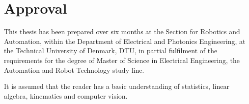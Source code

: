 \section*{Approval}
This thesis has been prepared over six months at the Section for Robotics and Automation, within the Department of Electrical and Photonics Engineering, at the Technical
University of Denmark, DTU, in partial fulfilment of the requirements for the degree of
Master of Science in Electrical Engineering, the Automation and Robot Technology study
line.

It is assumed that the reader has a basic understanding of statistics, linear algebra,
kinematics and computer vision.

\vfill

\begin{center}
\namesigdate{\thesisauthor~-~\studentnumber}
\end{center}

\vfill

